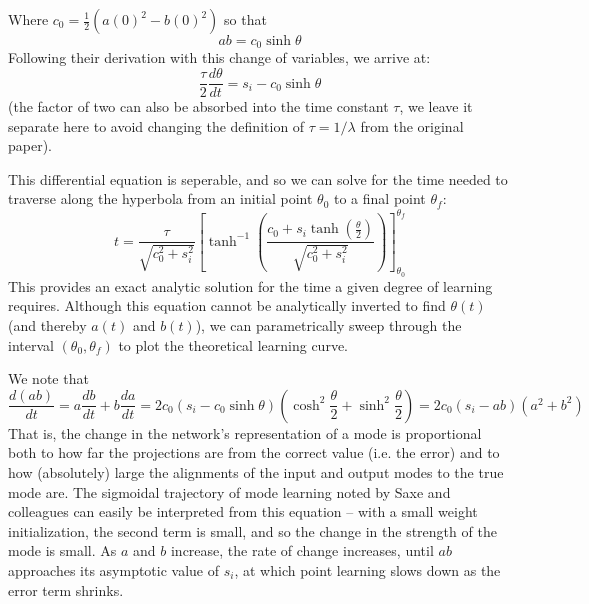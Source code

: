 \documentclass{article}
\begin{document}
Where $c_0 = \frac{1}{2} (a(0)^2-b(0)^2)$ so that
$$ab = c_0 \sinh \theta$$
Following their derivation with this change of variables, we arrive at:
$$\frac{\tau}{2} \frac{d\theta}{dt} = s_i - c_0 \sinh \theta$$
(the factor of two can also be absorbed into the time constant $\tau$, we leave it separate here to avoid changing the definition of $\tau = 1/\lambda$ from the original paper). \par
This differential equation is seperable, and so we can solve for the time needed to traverse along the hyperbola from an initial point $\theta_0$ to a final point $\theta_f$:
$$t = \frac{\tau}{\sqrt{c_0^2 + s_i^2}} \left[\tanh^{-1} \left( \frac{c_0 + s_i \tanh\left( \frac{\theta}{2} \right)}{\sqrt{c_0^2+s_i^2}}\right)\right]_{\theta_0}^{\theta_f}$$ %
This provides an exact analytic solution for the time a given degree of learning requires. Although this equation cannot be analytically inverted to find $\theta(t)$ (and thereby $a(t)$ and $b(t)$), we can parametrically sweep through the interval $(\theta_0, \theta_f)$ to plot the theoretical learning curve. \par
We note that 
$$\frac{d(ab)}{dt} = a \frac{db}{dt} + b \frac{da}{dt} = 2 c_0 (s_i - c_0 \sinh \theta) \left( \cosh^2 \frac{\theta}{2} + \sinh^2 \frac{\theta}{2} \right) = 2 c_0 \left(s_i - ab\right) \left(a^2 + b^2 \right)$$
That is, the change in the network's representation of a mode is proportional both to how far the projections are from the correct value (i.e. the error) and to how (absolutely) large the alignments of the input and output modes to the true mode are. The sigmoidal trajectory of mode learning noted by Saxe and colleagues can easily be interpreted from this equation -- with a small weight initialization, the second term is small, and so the change in the strength of the mode is small. As $a$ and $b$ increase, the rate of change increases, until $ab$ approaches its asymptotic value of $s_i$, at which point learning slows down as the error term shrinks. \par
\end{document}
